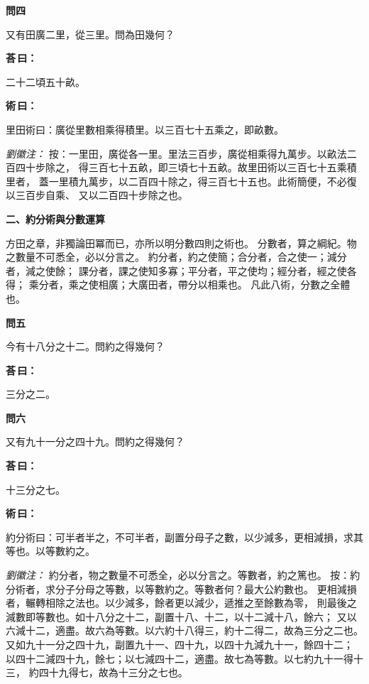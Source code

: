 \documentclass[11pt,a4paper]{article}
\newenvironment{problem}[1][]{%
  \par\vspace{0.6em}\noindent\textcolor{problemcolor}{\textbf{問\ignorespaces#1\unskip}\hspace{0.5em}}%
  \ignorespaces
}{\par\vspace{0.4em}}
\newenvironment{answer}{%
  \par\noindent\textcolor{answercolor}{\textbf{荅\,曰：}}%
  \ignorespaces
}{\par\vspace{0.3em}}
\newenvironment{method}{%
  \par\noindent\textcolor{methodcolor}{\textbf{術\,曰：}}%
  \ignorespaces
}{\par\vspace{0.4em}}
\newenvironment{liuhuicomm}{%
  \par\vspace{0.3em}\noindent\textcolor{commentarycolor}{\small\textit{劉徽注：}}}%
  {\par\vspace{0.5em}}
\begin{document}
\begin{problem}[四]
又有田廣二里，從三里。問為田幾何？
\end{problem}

\begin{answer}
二十二頃五十畝。
\end{answer}

\begin{method}
里田術曰：廣從里數相乘得積里。以三百七十五乘之，即畝數。
\end{method}

\begin{liuhuicomm}
按：一里田，廣從各一里。里法三百步，廣從相乘得九萬步。以畝法二百四十步除之，
得三百七十五畝，即三頃七十五畝。故里田術以三百七十五乘積里者，
蓋一里積九萬步，以二百四十除之，得三百七十五也。此術簡便，不必復以三百步自乘、
又以二百四十步除之也。
\end{liuhuicomm}

\vspace{0.8em}
\noindent\textbf{\large 二、約分術與分數運算}
\vspace{0.5em}

\noindent 方田之章，非獨論田冪而已，亦所以明分數四則之術也。
分數者，算之綱紀。物之數量不可悉全，必以分言之。
約分者，約之使簡；合分者，合之使一；減分者，減之使餘；
課分者，課之使知多寡；平分者，平之使均；經分者，經之使各得；
乘分者，乘之使相廣；大廣田者，帶分以相乘也。
凡此八術，分數之全體也。

\begin{problem}[五]
今有十八分之十二。問約之得幾何？
\end{problem}

\begin{answer}
三分之二。
\end{answer}

\begin{problem}[六]
又有九十一分之四十九。問約之得幾何？
\end{problem}

\begin{answer}
十三分之七。
\end{answer}

\begin{method}
約分術曰：可半者半之，不可半者，副置分母子之數，以少減多，更相減損，求其等也。以等數約之。
\end{method}

\begin{liuhuicomm}
約分者，物之數量不可悉全，必以分言之。等數者，約之篤也。
按：約分術者，求分子分母之等數，以等數約之。等數者何？最大公約數也。
更相減損者，輾轉相除之法也。以少減多，餘者更以減少，遞推之至餘數為零，
則最後之減數即等數也。如十八分之十二，副置十八、十二，以十二減十八，餘六；
又以六減十二，適盡。故六為等數。以六約十八得三，約十二得二，故為三分之二也。
又如九十一分之四十九，副置九十一、四十九，以四十九減九十一，餘四十二；
以四十二減四十九，餘七；以七減四十二，適盡。故七為等數。以七約九十一得十三，
約四十九得七，故為十三分之七也。
\end{liuhuicomm}
\end{document}
